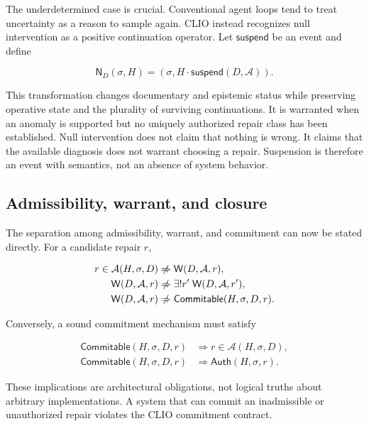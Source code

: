 \documentclass[11pt]{article}
\begin{document}
The underdetermined case is crucial. Conventional agent loops tend to treat uncertainty as a reason to sample again. CLIO instead recognizes null intervention as a positive continuation operator. Let $\mathsf{suspend}$ be an event and define

\begin{equation}
\mathsf N_D(\sigma,H)
=
(\sigma,H\cdot\mathsf{suspend}(D,\mathcal A)).
\label{eq:null-intervention}
\end{equation}

This transformation changes documentary and epistemic status while preserving operative state and the plurality of surviving continuations. It is warranted when an anomaly is supported but no uniquely authorized repair class has been established. Null intervention does not claim that nothing is wrong. It claims that the available diagnosis does not warrant choosing a repair. Suspension is therefore an event with semantics, not an absence of system behavior.

\subsection{Admissibility, warrant, and closure}

The separation among admissibility, warrant, and commitment can now be stated directly. For a candidate repair $r$,

\begin{align}
r\in\mathcal A(H,\sigma,D)
&\centernot\Rightarrow
\mathsf W(D,\mathcal A,r),
\label{eq:adm-not-warrant}\\
\mathsf W(D,\mathcal A,r)
&\centernot\Rightarrow
\exists!r'\;\mathsf W(D,\mathcal A,r'),
\label{eq:warrant-not-unique}\\
\mathsf W(D,\mathcal A,r)
&\centernot\Rightarrow
\mathsf{Commitable}(H,\sigma,D,r).
\label{eq:warrant-not-commit}
\end{align}

Conversely, a sound commitment mechanism must satisfy

\begin{align}
\mathsf{Commitable}(H,\sigma,D,r)
&\Rightarrow r\in\mathcal A(H,\sigma,D),\\
\mathsf{Commitable}(H,\sigma,D,r)
&\Rightarrow \mathsf{Auth}(H,\sigma,r).
\end{align}

These implications are architectural obligations, not logical truths about arbitrary implementations. A system that can commit an inadmissible or unauthorized repair violates the CLIO commitment contract.
\end{document}
